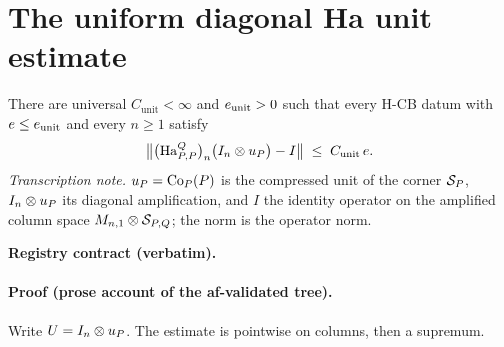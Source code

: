 \section{The uniform diagonal Ha unit estimate}\label{sec:hcb3-diagonal-unit}

\begin{lemma}\label{lem:hcb3-diagonal-unit}
There are universal $C_{\mathrm{unit}}<\infty$ and $e_{\mathrm{unit}}>0$ such that
every H-CB datum with $e\le e_{\mathrm{unit}}$ and every $n\ge1$ satisfy
\begin{equation}\label{eq:du-main}
  \bigl\lVert\bigl(\mathrm{Ha}^{Q}_{P,P}\bigr)_{n}\bigl(I_{n}\otimes u_{P}\bigr)-I\bigr\rVert
  \;\le\;C_{\mathrm{unit}}\,e .
\end{equation}
\emph{Transcription note.} $u_{P}=\mathrm{Co}_{P}(P)$ is the compressed unit of the corner
$\mathcal S_{P}$, $I_{n}\otimes u_{P}$ its diagonal amplification, and $I$ the identity
operator on the amplified column space $M_{n,1}\otimes\mathcal S_{P,Q}$; the norm is the
operator norm.
\end{lemma}

\noindent\textbf{Registry contract (verbatim).}

\paragraph{Proof (prose account of the af-validated tree).}
Write $U=I_{n}\otimes u_{P}$. The estimate is pointwise on columns, then a supremum.

